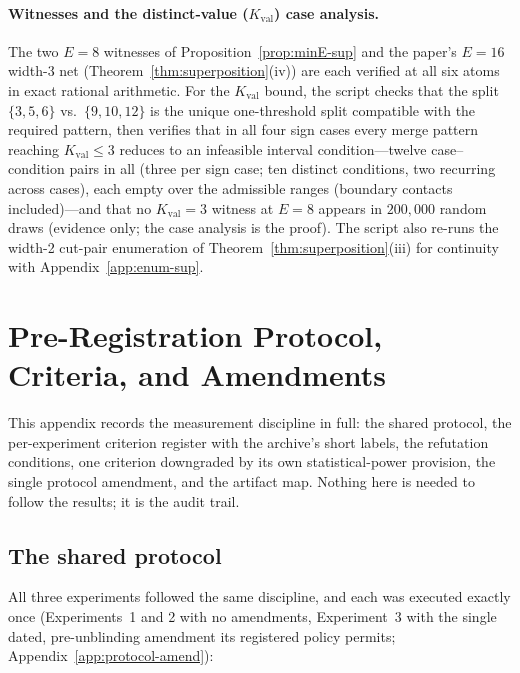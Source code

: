 \documentclass[twocolumn,10pt]{article}
\theoremstyle{definition}
\theoremstyle{remark}
\newcommand{\Kval}{K_{\mathrm{val}}}
\begin{document}
\paragraph{Witnesses and the distinct-value ($\Kval$) case analysis.} The two
$E = 8$ witnesses of Proposition~\ref{prop:minE-sup} and the paper's
$E = 16$ width-3 net (Theorem~\ref{thm:superposition}(iv)) are each
verified at all six atoms in exact rational arithmetic. For the
$\Kval$ bound, the script checks that the split
$\{3,5,6\}$ vs.\ $\{9,10,12\}$ is the unique one-threshold split
compatible with the required pattern, then verifies that in all four
sign cases every merge pattern reaching $\Kval \le 3$
reduces to an infeasible interval condition---twelve case--condition
pairs in all (three per sign case; ten distinct conditions, two
recurring across cases), each empty over the
admissible ranges (boundary contacts included)---and that no
$\Kval = 3$ witness at $E = 8$ appears in $200{,}000$ random draws
(evidence only; the case analysis is the proof). The script also
re-runs the width-2 cut-pair enumeration of
Theorem~\ref{thm:superposition}(iii) for continuity with
Appendix~\ref{app:enum-sup}.

\section{Pre-Registration Protocol, Criteria, and Amendments}
\label{app:protocol}

This appendix records the measurement discipline in full: the shared
protocol, the per-experiment criterion register with the archive's
short labels, the refutation conditions, one criterion downgraded by
its own statistical-power provision, the single protocol amendment,
and the artifact map. Nothing here is needed to follow the results;
it is the audit trail.

\subsection{The shared protocol}
\label{app:protocol-shared}

All three experiments followed the same discipline, and each was
executed exactly once (Experiments~1 and 2 with no amendments,
Experiment~3 with the single dated, pre-unblinding amendment its
registered policy permits; Appendix~\ref{app:protocol-amend}):
\end{document}
